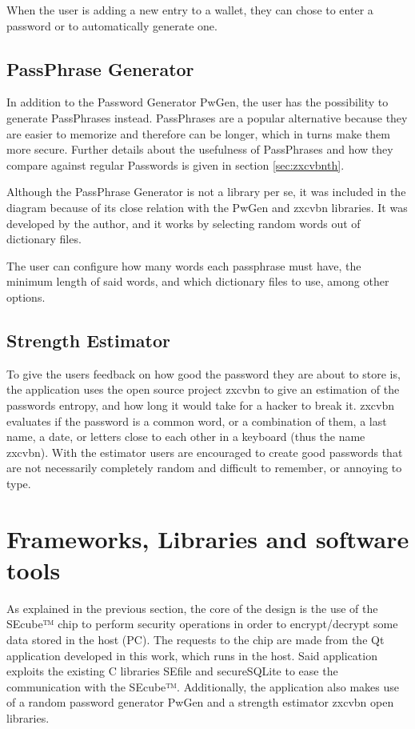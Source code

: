 When the user is adding a new entry to a wallet, they can chose to enter a password or to automatically generate one.

\subsection{PassPhrase Generator}
In addition to the Password Generator PwGen, the user has the possibility to generate PassPhrases instead. PassPhrases are a popular alternative because they are easier to memorize and therefore can be longer, which in turns make them more secure. Further details about the usefulness of PassPhrases and how they compare against regular Passwords is given in section \ref{sec:zxcvbnth}.

Although the PassPhrase Generator is not a library per se, it was included in the diagram because of its close relation with the PwGen and zxcvbn \cite{zxgit} libraries. It was developed by the author, and it works by selecting random words out of dictionary files. 

The user can configure how many words each passphrase must have, the minimum length of said words, and which dictionary files to use, among other options.

\subsection{Strength Estimator}
To give the users feedback on how good the password they are about to store is, the application uses the open source project zxcvbn to give an estimation of the passwords entropy, and how long it would take for a hacker to break it. zxcvbn evaluates if the password is a common word, or a combination of them, a last name, a date, or letters close to each other in a keyboard (thus the name zxcvbn). With the estimator users are encouraged to create good passwords that are not necessarily completely random and difficult to remember, or annoying to type.

\section{Frameworks, Libraries and software tools} \label{sec:lib}

As explained in the previous section, the core of the design is the use of the SEcube™ chip to perform security operations in order to encrypt/decrypt some data stored in the host (PC). The requests to the chip are made from the Qt application developed in this work, which runs in the host. Said application exploits the existing C libraries SEfile and secureSQLite to ease the communication with the SEcube™. Additionally, the application also makes use of a random password generator PwGen and a strength estimator zxcvbn open libraries. 

